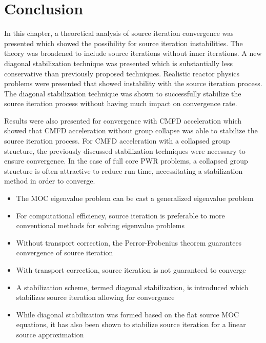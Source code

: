 \section{Conclusion}
\label{sec:convergence-conclusion}

In this chapter, a theoretical analysis of source iteration convergence was presented which showed the possibility for source iteration instabilities. The theory was broadened to include source iterations without inner iterations. A new diagonal stabilization technique was presented which is substantially less conservative than previously proposed techniques. Realistic reactor physics problems were presented that showed instability with the source iteration process. The diagonal stabilization technique was shown to successfully stabilize the source iteration process without having much impact on convergence rate.

Results were also presented for convergence with \ac{CMFD} acceleration which showed that \ac{CMFD} acceleration without group collapse was able to stabilize the source iteration process. For \ac{CMFD} acceleration with a collapsed group structure, the previously discussed stabilization techniques were necessary to ensure convergence. In the case of full core \ac{PWR} problems, a collapsed group structure is often attractive to reduce run time, necessitating a stabilization method in order to converge.


\vfill
\begin{highlightsbox}[frametitle=Highlights]
	\begin{itemize}
		
		\item The \ac{MOC} eigenvalue problem can be cast a generalized eigenvalue problem
		
		\item For computational efficiency, source iteration is preferable to more conventional methods for solving eigenvalue problems
		
		\item Without transport correction, the Perror-Frobenius theorem guarantees convergence of source iteration
		
		\item With transport correction, source iteration is not guaranteed to converge
		
		\item A stabilization scheme, termed diagonal stabilization, is introduced which stabilizes source iteration allowing for convergence
		
		\item While diagonal stabilization was formed based on the flat source \ac{MOC} equations, it has also been shown to stabilize source iteration for a linear source approximation
		
	\end{itemize}
\end{highlightsbox}
\vfill